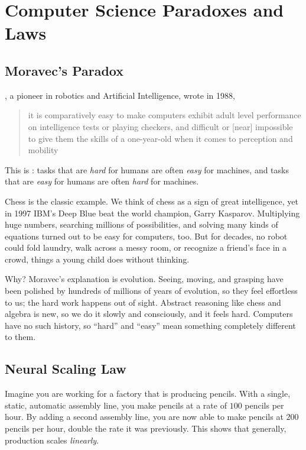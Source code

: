 \section{Computer Science Paradoxes and Laws}
\subsection{Moravec's Paradox}
, a pioneer in robotics and Artificial Intelligence, wrote in 1988,
\begin{quote}
    it is comparatively easy to make computers exhibit adult level performance on intelligence tests or playing checkers, and difficult or [near] impossible to give them the skills of a one-year-old when it comes to perception and mobility
\end{quote}

This is : tasks that are \emph{hard} for
humans are often \emph{easy} for machines, and tasks that are \emph{easy}
for humans are often \emph{hard} for machines.

Chess is the classic example. We think of chess as a sign of great
intelligence, yet in 1997 IBM's Deep Blue beat the world champion, Garry
Kasparov. Multiplying huge numbers, searching millions of possibilities,
and solving many kinds of equations turned out to be easy for computers,
too. But for decades, no robot could fold laundry, walk across a messy room,
or recognize a friend's face in a crowd, things a young child does without
thinking.

Why? Moravec's explanation is evolution. Seeing, moving, and grasping have
been polished by hundreds of millions of years of evolution, so they feel
effortless to us; the hard work happens out of sight. Abstract reasoning
like chess and algebra is new, so we do it slowly and consciously, and it
feels hard. Computers have no such history, so ``hard'' and ``easy'' mean
something completely different to them.
\subsection{Neural Scaling Law}
Imagine you are working for a factory that is producing pencils. With a single, static, automatic assembly line, you make pencils at a rate of $100$ pencils per hour. By adding a second assembly line, you are now able to make pencils at $200$ pencils per hour, double the rate it was previously. This shows that generally, production scales \emph{linearly}.

